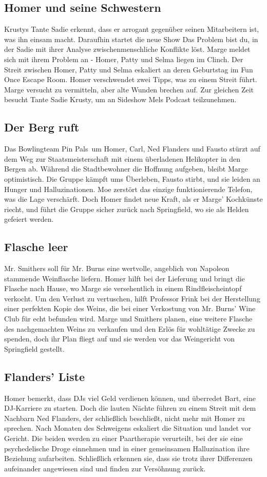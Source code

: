\subsection{Homer und seine Schwestern}
Krustys Tante Sadie erkennt, dass er arrogant gegenüber seinen Mitarbeitern ist, was ihn einsam macht. Daraufhin startet die neue Show \glqq Das Problem bist du\grqq, in der Sadie mit ihrer Analyse zwischenmenschliche Konflikte löst. Marge meldet sich mit ihrem Problem an - Homer, Patty und Selma liegen im Clinch.
Der Streit zwischen Homer, Patty und Selma eskaliert an deren Geburtstag im Fun Once Escape Room. Homer verschwendet zwei Tipps, was zu einem Streit führt. Marge versucht zu vermitteln, aber alte Wunden brechen auf. Zur gleichen Zeit besucht Tante Sadie Krusty, um an Sideshow Mels Podcast teilzunehmen.

\subsection{Der Berg ruft}
Das Bowlingteam \glqq Pin Pals\grqq\ um Homer, Carl, Ned Flanders und Fausto stürzt auf dem Weg zur Staatsmeisterschaft mit einem überladenen Helikopter in den Bergen ab. Während die Stadtbewohner die Hoffnung aufgeben, bleibt Marge optimistisch. Die Gruppe kämpft ums Überleben, Fausto stirbt, und sie leiden an Hunger und Halluzinationen. Moe zerstört das einzige funktionierende Telefon, was die Lage verschärft. Doch Homer findet neue Kraft, als er Marge' Kochkünste riecht, und führt die Gruppe sicher zurück nach Springfield, wo sie als Helden gefeiert werden.

\subsection{Flasche leer}
Mr. Smithers soll für Mr. Burns eine wertvolle, angeblich von Napoleon stammende Weinflasche liefern. Homer hilft bei der Lieferung und bringt die Flasche nach Hause, wo Marge sie versehentlich in einem Rindfleischeintopf verkocht. Um den Verlust zu vertuschen, hilft Professor Frink bei der Herstellung einer perfekten Kopie des Weins, die bei einer Verkostung von Mr. Burns' Wine Club für echt befunden wird. Marge und Smithers planen, eine weitere Flasche des nachgemachten Weins zu verkaufen und den Erlös für wohltätige Zwecke zu spenden, doch ihr Plan fliegt auf und sie werden vor das Weingericht von Springfield gestellt.

\subsection{Flanders' Liste}
Homer bemerkt, dass DJs viel Geld verdienen können, und überredet Bart, eine DJ-Karriere zu starten. Doch die lauten Nächte führen zu einem Streit mit dem Nachbarn Ned Flanders, der schließlich beschließt, nicht mehr mit Homer zu sprechen. Nach Monaten des Schweigens eskaliert die Situation und landet vor Gericht. Die beiden werden zu einer Paartherapie verurteilt, bei der sie eine psychedelische Droge einnehmen und in einer gemeinsamen Halluzination ihre Beziehung aufarbeiten. Schließlich erkennen sie, dass sie trotz ihrer Differenzen aufeinander angewiesen sind und finden zur Versöhnung zurück.

